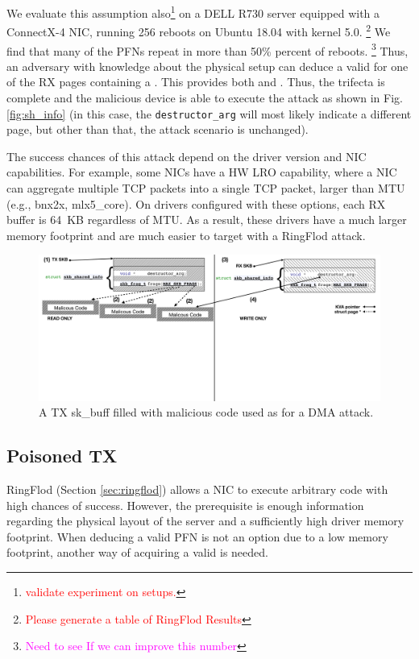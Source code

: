 We evaluate this assumption also\footnote{\textcolor{red}{validate experiment on setups.}} on a DELL R730 server equipped with a ConnectX-4 NIC, running 256 reboots on Ubuntu 18.04 with kernel 5.0. 
\footnote{\textcolor{red}{Please generate a table of RingFlod Results}} We find that many of the PFNs repeat in more than 50\% percent of reboots. \footnote{\textcolor{magenta}{Need to see If we can improve this number}} Thus, an adversary with knowledge about the physical setup can deduce a valid \kva{} for one of the RX pages containing a \mabaf. This provides both \means{} and \motivation{}. Thus, the trifecta is complete and the malicious device is able to execute the attack as shown in Fig. \ref{fig:sh_info} (in this case, the \texttt{destructor\_arg} will most likely indicate a different page, but other than that, the attack scenario is unchanged).

The success chances of this attack depend on the driver version and NIC capabilities. For example, some NICs have a HW LRO capability, where a NIC can aggregate multiple TCP packets into a single TCP packet, larger than MTU \cite{mlx5_lro}(e.g., bnx2x, mlx5\_core). On drivers configured with these options, each RX buffer is 64~KB regardless of MTU. As a result, these drivers have a much larger memory footprint\cite{MSMT18} and are much easier to target with a RingFlod attack.

\begin{figure}[t]
    \centering
    \includegraphics[width=\linewidth]{figs/accomplice.pdf}
    \caption{A TX sk\_buff filled with malicious code used as \means{} for a DMA attack.}
    \label{fig:payload}
\end{figure}
\subsection{Poisoned TX}\label{sec:posion}

RingFlod (Section \ref{sec:ringflod}) allows a NIC to execute arbitrary code with high chances of success. However, the prerequisite is enough information regarding the physical layout of the server and a sufficiently high driver memory footprint. When deducing a valid PFN is not an option due to a low memory footprint, another way of acquiring a valid \kva{} is needed.


